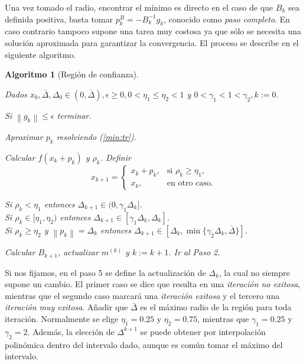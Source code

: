 \documentclass[11pt,a4paper]{book}
\newtheorem{algorithm}[theorem]{Algoritmo}
\theoremstyle{definition}
\theoremstyle{remark}
\newcommand{\norm}[1]{\left\lVert#1\right\rVert}
\begin{document}
Una vez tomado el radio, encontrar el mínimo es directo en el caso de que $B_k$ sea definida
positiva, basta tomar $p_k^B = -B_k^{-1}g_k$, conocido como \textit{paso completo}. En caso
contrario tampoco supone una tarea muy costosa ya que sólo se necesita una solución aproximada
para garantizar la convergencia. El proceso se describe en el siguiente algoritmo.

\begin{algorithm}[Región de confianza] \leavevmode
	\label{alg:tr}
	\begin{steps}
		\item Dados $x_0, \bar{\Delta}, \Delta_0 \in (0, \bar{\Delta}), \epsilon \geq
			0, 0<\eta_1\leq\eta_2<1$ y $0<\gamma_1<1<\gamma_2, k:=0$.
		\item Si $\norm{g_k} \leq \epsilon$ terminar.
		\item Aproximar $p_k$ resolviendo (\ref{min:tr}).
		\item Calcular $f(x_k+p_k)$ y $\rho_k$. Definir
			\begin{equation*}
				x_{k+1} = \begin{cases}
					x_k + p_k, & \text{si } \rho_k \geq \eta_1, \\
					x_k, & \text{en otro caso.}
				\end{cases}
			\end{equation*}
		\item Si $\rho_k < \eta_1$ entonces $\Delta_{k+1} \in (0,\gamma_1 \Delta_k]$. \\
			Si $\rho_k \in [\eta_1, \eta_2)$ entonces $\Delta_{k+1} \in [\gamma_1 \Delta_k,\Delta_k]$. \\
			Si $\rho_k \geq \eta_2$ y $\norm{p_k}=\Delta_k$ entonces
			$\Delta_{k+1} \in [\Delta_k, \min \{\gamma_2 \Delta_k,\bar{\Delta}\}]$.
		\item Calcular $B_{k+1}$, actualizar $m^{(k)}$ y $k:=k+1$. Ir al Paso 2.
	\end{steps}
\end{algorithm}
Si nos fijamos, en el paso 5 se define la actualización de $\Delta_k$, la cual no siempre supone un cambio.
El primer caso se dice que resulta en una \textit{iteración no exitosa}, mientras que el segundo caso marcará
una \textit{iteración exitosa} y el tercero una \textit{iteración muy exitosa}.
Añadir que $\bar \Delta$ es el máximo radio de la región para toda iteración.
Normalmente se elige $\eta_1 = 0.25$ y $\eta_2 = 0.75$, mientras que $\gamma_1 = 0.25$ y $\gamma_2 = 2$.
Además, la elección de $\Delta^{k+1}$ se puede obtener por interpolación polinómica dentro del
intervalo dado,
aunque es común tomar el máximo del intervalo.
\end{document}
